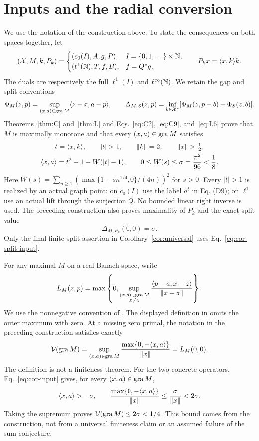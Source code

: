 \section{Inputs and the radial conversion}
We use the notation of the construction above. To state the consequences on both
spaces together, let
\[
(\mathcal X,M,k,P_k)=
\begin{cases}
(c_0(I),A,g,P),&I=\{0,1,\ldots\}\times\mathbb N,\\
(\ell^1(\mathbb N),T,f,B),&f=Q^*g,
\end{cases}
\qquad P_kx=\langle x,k\rangle k.
\]
The duals are respectively the full $\ell^1(I)$ and $\ell^\infty(\mathbb N)$.
We retain the gap and split conventions
\[
\Phi_M(z,p)=\sup_{(x,a)\in\operatorname{gra} M}\langle z-x,a-p\rangle,\qquad
\Delta_{M,S}(z,p)=\inf_{b\in\mathcal X^*}
       [\Phi_M(z,p-b)+\Phi_S(z,b)].
\]
Theorems~\ref{thm:C} and~\ref{thm:L} and
Eqs.~\eqref{eq:C2}, \eqref{eq:C9}, and~\eqref{eq:L6} prove
that $M$ is maximally monotone and that every $(x,a)\in\operatorname{gra} M$ satisfies
\begin{equation}
\begin{gathered}
t=\pair{x}{k},\qquad |t|>1,\qquad
\|k\|=2,\qquad \|x\|>\tfrac12,\\
\pair{x}{a}=t^2-1-W(|t|-1),\qquad
0\le W(s)\le\sigma=\frac{\pi^2}{96}<\frac18.
\end{gathered}
\label{eq:cor-input}
\end{equation}
Here $W(s)=\sum_{n\ge1}(\max\{1-sn^{1/4},0\}/(4n))^2$ for $s>0$.
Every $|t|>1$ is realized by an actual graph point: on $c_0(I)$ use the
label $a^t$ in Eq. (D9); on $\ell^1$ use an actual lift through the
surjection $Q$. No bounded linear right inverse is used. The preceding construction
also proves maximality of $P_k$ and the exact split value
\begin{equation}
\Delta_{M,P_k}(0,0)=\sigma.
\label{eq:cor-split-input}
\end{equation}
Only the final finite-split assertion in Corollary~\ref{cor:universal}
uses Eq.~\eqref{eq:cor-split-input}.

For any maximal $M$ on a real Banach space, write
\begin{equation}
L_M(z,p)=\max\left\{0,
\sup_{\substack{(x,a)\in\operatorname{gra} M\\x\ne z}}
\frac{\langle p-a,x-z\rangle}{\|x-z\|}\right\}.
\label{eq:cor-Verona}
\end{equation}
We use the nonnegative convention of \cite{verona2008}. The displayed
definition in \cite[Section~2]{verona2012} omits the outer maximum with
zero. At a missing zero primal, the notation in
the preceding construction satisfies exactly
\begin{equation}
\mathcal V(\operatorname{gra} M)=
\sup_{(x,a)\in\operatorname{gra} M}\frac{\max\{0,-\langle x,a\rangle\}}{\|x\|}
=L_M(0,0).
\label{eq:cor-V}
\end{equation}
The definition is not a finiteness theorem. For the two concrete
operators, Eq.~\eqref{eq:cor-input} gives, for every $(x,a)\in\operatorname{gra} M$,
\[
\langle x,a\rangle>-\sigma,\qquad
\frac{\max\{0,-\langle x,a\rangle\}}{\|x\|}
\le\frac{\sigma}{\|x\|}<2\sigma.
\]
Taking the supremum proves $\mathcal V(\operatorname{gra} M)\le2\sigma<1/4$.
This bound comes from the construction, not from a universal finiteness
claim or an assumed failure of the sum conjecture.

